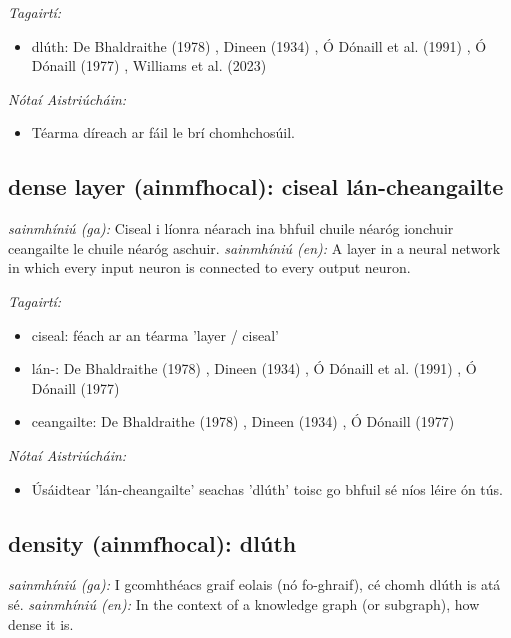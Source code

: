 \documentclass{article}
\begin{document}
 \noindent \textit{Tagairtí:}
\begin{itemize}
	\item dlúth: De Bhaldraithe (1978) \cite{de-bhaldraithe}, Dineen (1934) \cite{dineen}, Ó Dónaill et al. (1991) \cite{focloir-beag}, Ó Dónaill (1977) \cite{odonaill}, Williams et al. (2023) \cite{storchiste}
\end{itemize}

 \noindent \textit{Nótaí Aistriúcháin:}
\begin{itemize}
	\item Téarma díreach ar fáil le brí chomhchosúil.
\end{itemize}


\subsection*{dense layer (ainmfhocal): ciseal lán-cheangailte} 
 \noindent \textit{sainmhíniú (ga):} Ciseal i líonra néarach ina bhfuil chuile néaróg ionchuir ceangailte le chuile néaróg aschuir.
\newline\newline
 \noindent \textit{sainmhíniú (en):} A layer in a neural network in which every input neuron is connected to every output neuron.
\newline

 \noindent \textit{Tagairtí:}
\begin{itemize}
	\item ciseal: féach ar an téarma 'layer / ciseal'
	\item lán-: De Bhaldraithe (1978) \cite{de-bhaldraithe}, Dineen (1934) \cite{dineen}, Ó Dónaill et al. (1991) \cite{focloir-beag}, Ó Dónaill (1977) \cite{odonaill}
	\item ceangailte: De Bhaldraithe (1978) \cite{de-bhaldraithe}, Dineen (1934) \cite{dineen}, Ó Dónaill (1977) \cite{odonaill}
\end{itemize}

 \noindent \textit{Nótaí Aistriúcháin:}
\begin{itemize}
	\item Úsáidtear 'lán-cheangailte' seachas 'dlúth' toisc go bhfuil sé níos léire ón tús.
\end{itemize}


\subsection*{density (ainmfhocal): dlúth} 
 \noindent \textit{sainmhíniú (ga):} I gcomhthéacs graif eolais (nó fo-ghraif), cé chomh dlúth is atá sé.
\newline\newline
 \noindent \textit{sainmhíniú (en):} In the context of a knowledge graph (or subgraph), how dense it is.
\newline
\end{document}

